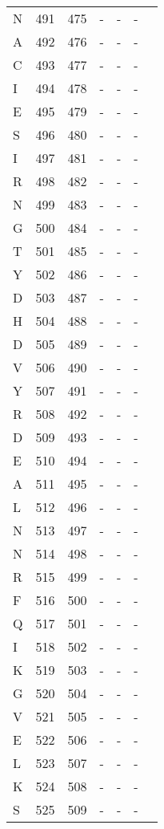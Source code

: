 \documentclass[10pt]{article}
\begin{document}
\begin{longtable}{lllllll}
  N & 491 & 475 & - & - & - &  \\ 
  A & 492 & 476 & - & - & - &  \\ 
  C & 493 & 477 & - & - & - &  \\ 
  I & 494 & 478 & - & - & - &  \\ 
  E & 495 & 479 & - & - & - &  \\ 
  S & 496 & 480 & - & - & - &  \\ 
  I & 497 & 481 & - & - & - &  \\ 
  R & 498 & 482 & - & - & - &  \\ 
  N & 499 & 483 & - & - & - &  \\ 
  G & 500 & 484 & - & - & - &  \\ 
  T & 501 & 485 & - & - & - &  \\ 
  Y & 502 & 486 & - & - & - &  \\ 
  D & 503 & 487 & - & - & - &  \\ 
  H & 504 & 488 & - & - & - &  \\ 
  D & 505 & 489 & - & - & - &  \\ 
  V & 506 & 490 & - & - & - &  \\ 
  Y & 507 & 491 & - & - & - &  \\ 
  R & 508 & 492 & - & - & - &  \\ 
  D & 509 & 493 & - & - & - &  \\ 
  E & 510 & 494 & - & - & - &  \\ 
  A & 511 & 495 & - & - & - &  \\ 
  L & 512 & 496 & - & - & - &  \\ 
  N & 513 & 497 & - & - & - &  \\ 
  N & 514 & 498 & - & - & - &  \\ 
  R & 515 & 499 & - & - & - &  \\ 
  F & 516 & 500 & - & - & - &  \\ 
  Q & 517 & 501 & - & - & - &  \\ 
  I & 518 & 502 & - & - & - &  \\ 
  K & 519 & 503 & - & - & - &  \\ 
  G & 520 & 504 & - & - & - &  \\ 
  V & 521 & 505 & - & - & - &  \\ 
  E & 522 & 506 & - & - & - &  \\ 
  L & 523 & 507 & - & - & - &  \\ 
  K & 524 & 508 & - & - & - &  \\ 
  S & 525 & 509 & - & - & - &  \\ 

\end{longtable}
\end{document}
